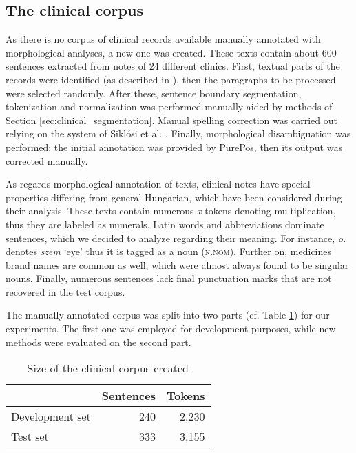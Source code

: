 \subsection{The clinical corpus}

As there is no corpus of clinical records available manually annotated with morphological analyses, a new one was created. 
These texts contain about 600 sentences extracted from notes of 24 different clinics. 
First, textual parts of the records were identified (as described in \cite{Siklosi2012}), then the paragraphs to be processed were selected randomly. 
After these, sentence boundary segmentation, tokenization and normalization was performed manually aided by methods of Section \ref{sec:clinical_segmentation}. 
Manual spelling correction was carried out relying on the system of Siklósi et al. \cite{Siklosi2013}. 
Finally, morphological disambiguation was performed: the initial annotation was provided by PurePos, then its output was corrected manually. 

As regards morphological annotation of texts, clinical notes have special properties differing from general Hungarian, which have been considered during their analysis. 
These texts contain numerous \textit{x} tokens denoting multiplication, thus they are labeled as numerals. 
Latin words and abbreviations dominate sentences, which we decided to analyze regarding their meaning. 
For instance, \textit{o.} denotes \textit{szem} `eye’ thus it is tagged as a noun (\textsc{n.nom}). 
Further on, medicines brand names are common as well, which were almost always found to be singular nouns. 
Finally, numerous sentences lack final punctuation marks that are not recovered in the test corpus. 

The manually annotated corpus was split into two parts (cf. Table \ref{tab:clin_corpus}) for our experiments. 
The first one was employed for development purposes, while new methods were evaluated on the second part.
%

\begin{table}[H]
\centering
\caption{Size of the clinical corpus created}
\label{tab:clin_corpus}
\begin{tabular}{ l  r  r } 
\hline
& Sentences & Tokens \\
\hline
Development set & 240 & 2,230 \\
Test set & 333 & 3,155 \\
\hline
\end{tabular}
\end{table}


